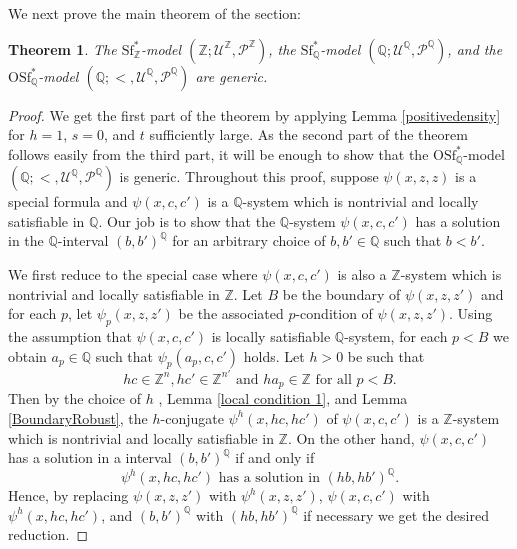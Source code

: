 \documentclass[letterpaper]{amsart}
\newcommand{\qq}{\mathbb{Q}}
\newcommand{\zz}{\mathbb{Z}}
\newcommand{\sU}{\mathscr{U}}
\newcommand{\sP}{\mathscr{P}}
\newcommand{\WSFZ}{\mathrm{Sf}^*_{\zz}}
\newcommand{\WSFQ}{\mathrm{Sf}^*_{\qq}}
\newcommand{\WOSFQ}{\mathrm{OSf}^*_{\qq}}
\newtheorem{thm}{Theorem}[section]
\begin{document}
\noindent We next prove the main theorem of the section:

\begin{thm} \label{genericity}
The $\WSFZ$-model $( \zz; \sU^\zz, \sP^\zz)$, the $\WSFQ$-model $(\qq; \sU^\qq, \sP^\qq)$,  and the $\WOSFQ$-model $(\qq; <, \sU^\qq, \sP^\qq)$  are generic.
\end{thm}
\begin{proof}
We get the first part of the theorem by applying Lemma \ref{positivedensity} for $h =1$, $s =0$, and $t$ sufficiently large.  As the second part of the theorem follows easily from the third part, it will be enough to show that the $\WOSFQ$-model $(\qq; <, \sU^\qq, \sP^\qq)$ is generic.  Throughout this proof, suppose $\psi(x,z,z)$ is a special formula and  $\psi(x, c, c')$  is  a $\qq$-system which is nontrivial and locally satisfiable in $\qq$.  Our job is to show that the $\qq$-system $\psi(x, c, c')$ has a solution in the $\qq$-interval $(b, b')^\qq$ for an arbitrary choice of $b, b' \in \qq$ such that $b<b'$.

We first reduce to the special case where $\psi(x, c, c')$ is also a $\zz$-system which is nontrivial and locally satisfiable in $\zz$. Let $B$ be the boundary of $\psi(x,z,z')$ and for each $p$, let $\psi_p(x,z,z')$ be the associated $p$-condition of $\psi(x,z,z')$. Using the assumption that $\psi(x, c, c')$ is locally satisfiable $\qq$-system, for each $p<B$ we obtain $a_p \in \qq$ such that $\psi_p(a_p,c,c')$ holds. Let $h>0$ be such that  
$$ hc \in \zz^n, hc' \in \zz^{n'} \text{ and } ha_p \in \zz \text{ for all } p<B. $$
Then by the choice of $h$ , Lemma \ref{local condition 1}, and Lemma \ref{BoundaryRobust}, the $h$-conjugate $\psi^h(x,hc,hc')$ of $\psi(x, c, c')$ is a $\zz$-system which is nontrivial and locally satisfiable in $\zz$.
On the other hand, $\psi(x,c,c')$ has a solution in a interval $(b,b')^\qq$ if and only if $$\psi^h(x,hc,hc') \text{ has a solution in } (hb,hb')^{\qq}.$$ Hence,  by replacing $\psi(x,z,z')$ with $\psi^h(x,z,z')$, $\psi(x, c, c')$ with $\psi^h(x,hc,hc')$, and $(b, b')^{\qq}$ with $(hb, hb')^{\qq}$ if necessary we get the desired reduction. 


\end{proof}
\end{document}
